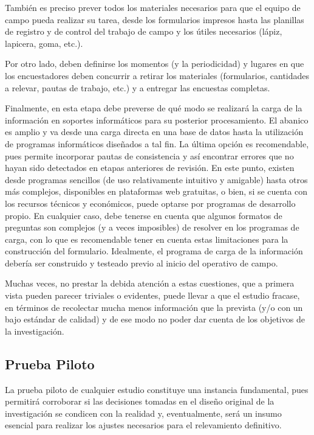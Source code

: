 \documentclass[
]{book}
\begin{document}
También es preciso prever todos los materiales necesarios para que el equipo de campo pueda realizar su tarea, desde los formularios impresos hasta las planillas de registro y de control del trabajo de campo y los útiles necesarios (lápiz, lapicera, goma, etc.).

Por otro lado, deben definirse los momentos (y la periodicidad) y lugares en que los encuestadores deben concurrir a retirar los materiales (formularios, cantidades a relevar, pautas de trabajo, etc.) y a entregar las encuestas completas.

Finalmente, en esta etapa debe preverse de qué modo se realizará la carga de la información en soportes informáticos para su posterior procesamiento. El abanico es amplio y va desde una carga directa en una base de datos hasta la utilización de programas informáticos diseñados a tal fin. La última opción es recomendable, pues permite incorporar pautas de consistencia y así encontrar errores que no hayan sido detectados en etapas anteriores de revisión. En este punto, existen desde programas sencillos (de uso relativamente intuitivo y amigable) hasta otros más complejos, disponibles en plataformas web gratuitas, o bien, si se cuenta con los recursos técnicos y económicos, puede optarse por programas de desarrollo propio. En cualquier caso, debe tenerse en cuenta que algunos formatos de preguntas son complejos (y a veces imposibles) de resolver en los programas de carga, con lo que es recomendable tener en cuenta estas limitaciones para la construcción del formulario. Idealmente, el programa de carga de la información debería ser construido y testeado previo al inicio del operativo de campo.

Muchas veces, no prestar la debida atención a estas cuestiones, que a primera vista pueden parecer triviales o evidentes, puede llevar a que el estudio fracase, en términos de recolectar mucha menos información que la prevista (y/o con un bajo estándar de calidad) y de ese modo no poder dar cuenta de los objetivos de la investigación.

\hypertarget{prueba-piloto}{%
\subsection{Prueba Piloto}\label{prueba-piloto}}

La prueba piloto de cualquier estudio constituye una instancia fundamental, pues permitirá corroborar si las decisiones tomadas en el diseño original de la investigación se condicen con la realidad y, eventualmente, será un insumo esencial para realizar los ajustes necesarios para el relevamiento definitivo.
\end{document}
